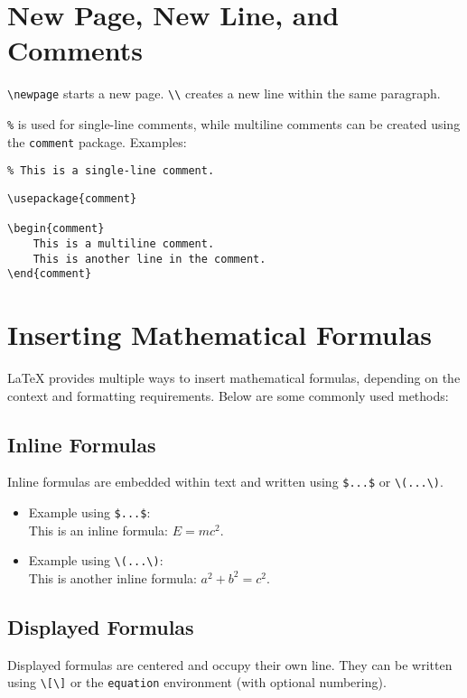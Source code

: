 \documentclass[12pt]{article}
\begin{document}
\section{New Page, New Line, and Comments}
\texttt{\textbackslash newpage} starts a new page. \texttt{\textbackslash\textbackslash} creates a new line within the same paragraph. 

\texttt{\%} is used for single-line comments, while multiline comments can be created using the \texttt{comment} package. Examples:

\begin{lstlisting}
% This is a single-line comment.
\end{lstlisting}

\begin{lstlisting}
\usepackage{comment}

\begin{comment}
    This is a multiline comment.
    This is another line in the comment.
\end{comment}
\end{lstlisting}

\section{Inserting Mathematical Formulas}
LaTeX provides multiple ways to insert mathematical formulas, depending on the context and formatting requirements. Below are some commonly used methods:

\subsection*{Inline Formulas}
Inline formulas are embedded within text and written using \texttt{\$...\$} or \texttt{\textbackslash(...\textbackslash)}.

\begin{itemize}
    \item Example using \texttt{\$...\$}: \\
    This is an inline formula: $E = mc^2$.
    \item Example using \texttt{\textbackslash(...\textbackslash)}:\\
    This is another inline formula: \( a^2 + b^2 = c^2 \).
\end{itemize}

\subsection*{Displayed Formulas}
Displayed formulas are centered and occupy their own line. They can be written using \texttt{\textbackslash[\textbackslash]} or the \texttt{equation} environment (with optional numbering).
\end{document}
